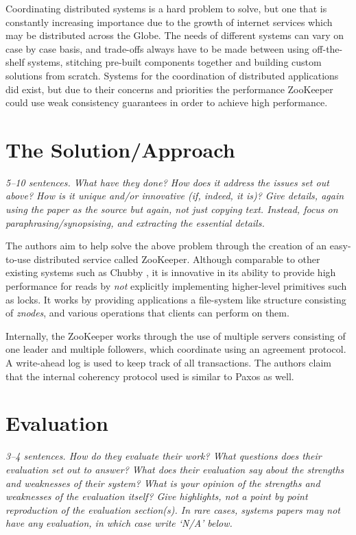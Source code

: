 \documentclass[11pt]{article}
\begin{document}
Coordinating distributed systems is a hard problem to solve, but one that is
constantly increasing importance due to the growth of internet services which
may be distributed across the Globe. The needs of different systems can vary on
case by case basis, and trade-offs always have to be made between using
off-the-shelf systems, stitching pre-built components together and building
custom solutions from scratch. Systems for the coordination of distributed
applications did exist, but due to their concerns and priorities the
performance ZooKeeper could use weak consistency guarantees in order to achieve
high performance.

\section*{The Solution/Approach}

\textsl{5--10 sentences. What have they done? How does it address the issues
set out above? How is it unique and/or innovative (if, indeed, it is)? Give
details, again using the paper as the source but again, not just copying text.
Instead, focus on paraphrasing/synopsising, and extracting the essential
details.}

The authors aim to help solve the above problem through the creation of an
easy-to-use distributed service called ZooKeeper. Although comparable to other
existing systems such as Chubby \cite{Chubby}, it is innovative in its ability
to provide high performance for reads by \textit{not} explicitly implementing
higher-level primitives such as locks. It works by providing applications a
file-system like structure consisting of \textit{znodes}, and various
operations that clients can perform on them.

Internally, the ZooKeeper works through the use of multiple servers consisting
of one leader and multiple followers, which coordinate using an agreement
protocol. A write-ahead log is used to keep track of all transactions. The
authors claim that the internal coherency protocol used is similar to Paxos as
well.


\section*{Evaluation}

\textsl{3--4 sentences. How do they evaluate their work? What questions does
their evaluation set out to answer? What does their evaluation say about the
strengths and weaknesses of their system? What is your opinion of the strengths
and weaknesses of the evaluation itself? Give highlights, not a point by point
reproduction of the evaluation section(s). In rare cases, systems papers may
not have any evaluation, in which case write `N/A' below.}
\end{document}
